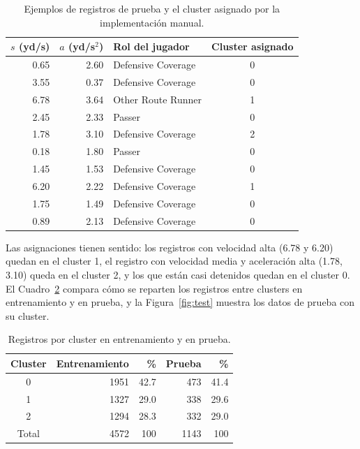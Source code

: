 \documentclass[11pt,a4paper]{article}
\begin{document}
\begin{table}[H]
  \centering
  \begin{tabular}{rrlc}
    \toprule
    $s$ (yd/s) & $a$ (yd/s$^2$) & Rol del jugador & Cluster asignado \\
    \midrule
    0.65 & 2.60 & Defensive Coverage & 0 \\
    3.55 & 0.37 & Defensive Coverage & 0 \\
    6.78 & 3.64 & Other Route Runner & 1 \\
    2.45 & 2.33 & Passer             & 0 \\
    1.78 & 3.10 & Defensive Coverage & 2 \\
    0.18 & 1.80 & Passer             & 0 \\
    1.45 & 1.53 & Defensive Coverage & 0 \\
    6.20 & 2.22 & Defensive Coverage & 1 \\
    1.75 & 1.49 & Defensive Coverage & 0 \\
    0.89 & 2.13 & Defensive Coverage & 0 \\
    \bottomrule
  \end{tabular}
  \caption{Ejemplos de registros de prueba y el cluster asignado por la implementación manual.}
  \label{tab:ejemplos}
\end{table}

Las asignaciones tienen sentido: los registros con velocidad alta (6.78 y 6.20) quedan en el cluster 1, el registro con velocidad media y aceleración alta (1.78, 3.10) queda en el cluster 2, y los que están casi detenidos quedan en el cluster 0. El Cuadro~\ref{tab:reparto} compara cómo se reparten los registros entre clusters en entrenamiento y en prueba, y la Figura~\ref{fig:test} muestra los datos de prueba con su cluster.

\begin{table}[H]
  \centering
  \begin{tabular}{crrrr}
    \toprule
    Cluster & Entrenamiento & \% & Prueba & \% \\
    \midrule
    0 & 1951 & 42.7 & 473 & 41.4 \\
    1 & 1327 & 29.0 & 338 & 29.6 \\
    2 & 1294 & 28.3 & 332 & 29.0 \\
    \midrule
    Total & 4572 & 100 & 1143 & 100 \\
    \bottomrule
  \end{tabular}
  \caption{Registros por cluster en entrenamiento y en prueba.}
  \label{tab:reparto}
\end{table}
\end{document}
